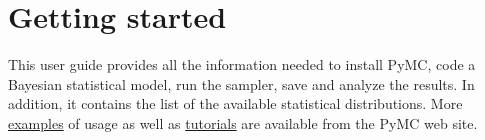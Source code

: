 
\hypertarget{getting-started}{}
\section{Getting started}
\label{getting-started}

This user guide provides all the information needed to install PyMC, code
a Bayesian statistical model, run the sampler, save and analyze the results.
In addition, it contains the list of the
available statistical distributions. More \href{http://code.google.com/p/pymc/}{examples} of usage as well as
\href{http://code.google.com/p/pymc/wiki/TutorialsAndRecipes}{tutorials}  are available from the PyMC web site.

